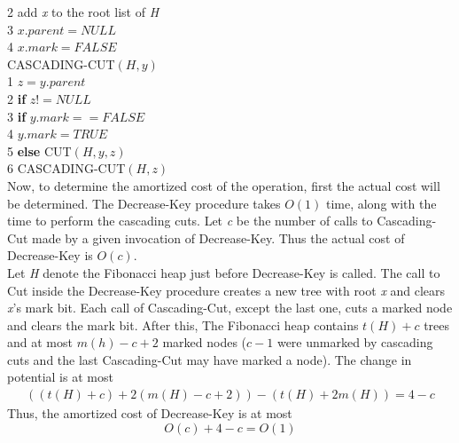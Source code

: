 \documentclass[12pt, a4paper]{article}
\begin{document}
	2\-\hspace{0.5cm} add \textit{x} to the root list of \textit{H} \\
	3\-\hspace{0.5cm} $x.parent = NULL$ \\
	4\-\hspace{0.5cm} $x.mark = FALSE$ \\
	\newline
	\large{CASCADING-CUT$(H, y)$} \\
	1\-\hspace{0.5cm} $z = y.parent$\\
	2\-\hspace{0.5cm} \textbf{if} $z != NULL$\\
	3\-\hspace{0.5cm} \-\hspace{0.5cm} \textbf{if} $y.mark == FALSE$ \\
	4\-\hspace{0.5cm} \-\hspace{0.5cm} \-\hspace{0.5cm} $y.mark = TRUE$ \\
	5\-\hspace{0.5cm} \-\hspace{0.5cm} \textbf{else} \large{CUT$(H, y, z)$}\\
	6\-\hspace{0.5cm} \-\hspace{0.5cm} \-\hspace{0.5cm} \large{CASCADING-CUT$(H, z)$}\\
	\newline
	Now, to determine the amortized cost of the operation, first the actual cost will be determined. The Decrease-Key procedure takes $O(1)$ time, along with the time to perform the cascading cuts. Let \textit{c} be the number of calls to Cascading-Cut made by a given invocation of Decrease-Key. Thus the actual cost of Decrease-Key is $O(c)$.\\
	Let \textit{H} denote the Fibonacci heap just before Decrease-Key is called. The call to Cut inside the Decrease-Key procedure creates a new tree with root \textit{x} and clears \textit{x}'s mark bit. Each call of Cascading-Cut, except the last one, cuts a marked node and clears the mark bit. After this, The Fibonacci heap contains $t(H) + c$ trees and at most $m(h) - c + 2$ marked nodes ($c-1$ were unmarked by cascading cuts and the last Cascading-Cut may have marked a node). The change in potential is at most
	\begin{equation*}
	\begin{split}
	((t(H)+c) +  2(m(H) - c + 2)) - (t(H) + 2m(H)) = 4 - c
	\end{split}
	\end{equation*}
	Thus, the amortized cost of Decrease-Key is at most
	$$O(c) + 4 - c = O(1)$$
	
\end{document}
